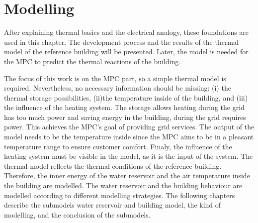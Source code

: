 \chapter{Modelling}
\label{ch:modelling}
After explaining thermal basics and the electrical analogy, these foundations are used in this chapter. The development process and the results of the thermal model of the reference building will be presented. Later, the model is needed for the MPC to predict the thermal reactions of the building.
\newline
    
    The focus of this work is on the MPC part, so a simple thermal model is required. Nevertheless, no necessary information should be missing: (i) the thermal storage possibilities, (ii)the temperature inside of the building, and (iii) the influence of the heating system. The storage allows heating during the grid has too much power and saving energy in the building, during the grid requires power. This achieves the MPC's goal of providing grid services. The output of the model needs to be the temperature inside since the MPC aims to be in a pleasant temperature range to ensure customer comfort. Finaly, the influence of the heating system must be visible in the model, as it is the input of the system.
    \newline
    The thermal model reflects the thermal conditions of the reference building. Therefore, the inner energy of the water reservoir and the air temperature inside the building are modelled. The water reservoir and the building behaviour are modelled according to different modelling strategies. The following chapters describe the submodels water reservoir and building model, the kind of modelling, and the conclusion of the submodels.
    
